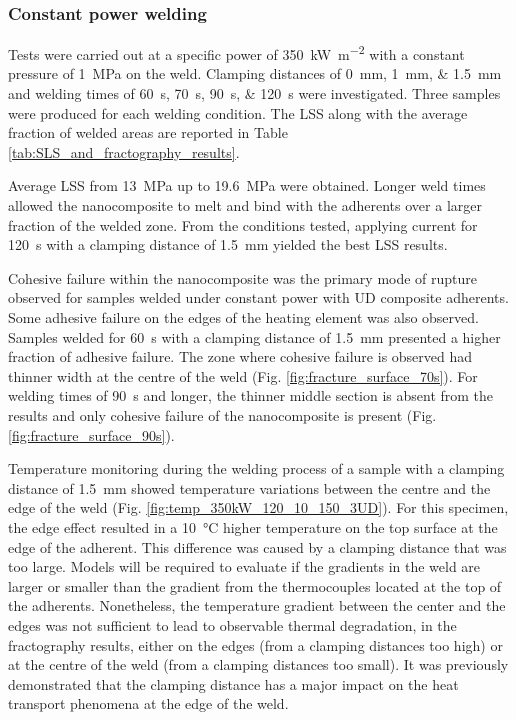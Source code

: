 \documentclass[11pt,review,times]{elsarticle}
\begin{document}
\subsubsection{Constant power welding}

Tests were carried out at a specific power of \SI{350}{\kW\per\square\metre} with a constant pressure of \SI{1}{\MPa} on the weld. 
Clamping distances of \SIlist{0;1;1.5}{\mm} and welding times of \SIlist{60;70;90;120}{\s} were investigated. 
Three samples were produced for each welding condition. 
The LSS along with the average fraction of welded areas are reported in Table \ref{tab:SLS_and_fractography_results}. 

Average LSS from \SI{13}{\MPa} up to \SI{19.6}{\MPa} were obtained. 
Longer weld times allowed the nanocomposite to melt and bind with the adherents over a larger fraction of the welded zone. 
From the conditions tested, applying current for \SI{120}{\s} with a clamping distance of \SI{1.5}{\mm} yielded the best LSS results. 

Cohesive failure within the nanocomposite was the primary mode of rupture observed for samples welded under constant power with UD composite adherents.
Some adhesive failure on the edges of the heating element was also observed. 
Samples welded for \SI{60}{\s} with a clamping distance of \SI{1.5}{\mm} presented a higher fraction of adhesive failure. 
The zone where cohesive failure is observed had thinner width at the centre of the weld (Fig. \ref{fig:fracture_surface_70s}). 
For welding times of \SI{90}{\s} and longer, the thinner middle section is absent from the results and only cohesive failure of the nanocomposite is present (Fig. \ref{fig:fracture_surface_90s}). 

Temperature monitoring during the welding process of a sample with a clamping distance of \SI{1.5}{\mm} showed temperature variations between the centre and the edge of the weld (Fig. \ref{fig:temp_350kW_120_10_150_3UD}).
For this specimen, the edge effect resulted in a \SI{10}{\celsius} higher temperature on the top surface at the edge of the adherent. 
This difference was caused by a clamping distance that was too large. 
Models will be required to evaluate if the gradients in the weld are larger or smaller than the gradient from the thermocouples located at the top of the adherents. 
Nonetheless, the temperature gradient between the center and the edges was not sufficient to lead to observable thermal degradation, in the fractography results, either on the edges (from a clamping distances too high) or at the centre of the weld (from a clamping distances too small). 
It was previously demonstrated that the clamping distance has a major impact on the heat transport phenomena at the edge of the weld. 
\end{document}
